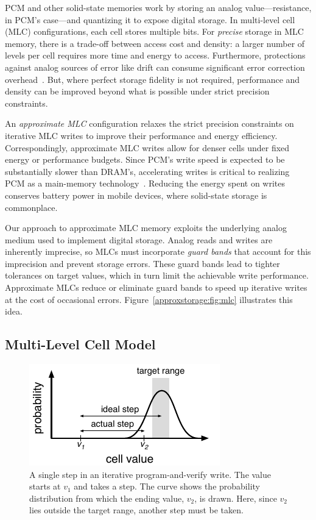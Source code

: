 PCM and other solid-state memories
work by storing an analog value---resistance, in PCM's case---and quantizing it to expose digital
storage. In multi-level cell (MLC) configurations, each cell stores
multiple bits. For \emph{precise} storage in MLC memory,
there is a trade-off between access cost and density: a larger number
of levels per cell requires more time and energy to access.
Furthermore, protections against analog sources of error like drift can consume
significant error correction overhead~\cite{drifttolerant}.
But, where perfect storage fidelity is not required,
performance and density can be improved beyond what is possible under
strict precision constraints.

An \emph{approximate MLC} configuration relaxes the strict precision
constraints on iterative MLC writes to improve their performance and energy
efficiency. Correspondingly, approximate MLC writes allow for denser cells
under fixed energy or performance budgets. Since PCM's write speed is expected
to be substantially slower than DRAM's, accelerating writes is critical to
realizing PCM as a main-memory technology~\cite{pcm-dram-alt}.
Reducing the energy
spent on writes conserves battery power in mobile devices, where
solid-state storage is commonplace.

Our approach to approximate MLC memory exploits the underlying
analog medium used to implement digital storage. Analog reads and
writes are inherently imprecise, so MLCs must incorporate \emph{guard
bands} that account for this imprecision and prevent storage errors.
These guard bands lead to tighter tolerances on target values, which in turn limit
the achievable write performance.
Approximate MLCs reduce or eliminate guard bands to speed up
iterative writes at the cost of occasional errors.
Figure~\ref{approxstorage:fig:mlc} illustrates this idea.

\subsection{Multi-Level Cell Model}
\label{approxstorage:sec:mlcmodel}

\begin{figure}
    \centering
    \includegraphics[scale=0.9]{figs/mlc-step}
    \caption{
        A single step in an iterative program-and-verify write. The value
        starts at $v_1$ and takes a step. The curve shows the probability
        distribution from which the ending value, $v_2$, is drawn. Here, since
        $v_2$ lies outside the target range, another step must be taken.
    }
    \label{approxstorage:fig:mlc-step}
\end{figure}

